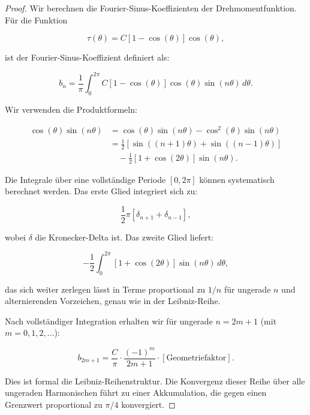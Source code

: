 \documentclass[a4paper,12pt]{article}
\theoremstyle{definition}
\begin{document}
\begin{proof}
  Wir berechnen die Fourier-Sinus-Koeffizienten der Drehmomentfunktion. Für die Funktion
  
  \begin{equation}
    \tau(\theta) = C[1 - \cos(\theta)]\cos(\theta),
  \end{equation}
  
  ist der Fourier-Sinus-Koeffizient definiert als:
  
  \begin{equation}
    b_n = \frac{1}{\pi} \int_0^{2\pi} C[1-\cos(\theta)]\cos(\theta) \sin(n\theta) \, d\theta.
  \end{equation}
  
  Wir verwenden die Produktformeln:
  
  \begin{align}
    [1-\cos(\theta)]\cos(\theta) \sin(n\theta) &= \cos(\theta)\sin(n\theta) - \cos^2(\theta)\sin(n\theta) \\
    &= \frac{1}{2}[\sin((n+1)\theta) + \sin((n-1)\theta)] \\
    &\quad - \frac{1}{2}[1 + \cos(2\theta)]\sin(n\theta).
  \end{align}
  
  Die Integrale über eine vollständige Periode $[0, 2\pi]$ können systematisch berechnet werden. Das erste Glied integriert sich zu:
  
  \begin{equation}
    \frac{1}{2}\pi[\delta_{n+1} + \delta_{n-1}],
  \end{equation}
  
  wobei $\delta$ die Kronecker-Delta ist. Das zweite Glied liefert:
  
  \begin{equation}
    -\frac{1}{2}\int_0^{2\pi} [1 + \cos(2\theta)]\sin(n\theta) \, d\theta,
  \end{equation}
  
  das sich weiter zerlegen lässt in Terme proportional zu $1/n$ für ungerade $n$ und alternierenden Vorzeichen, genau wie in der Leibniz-Reihe.
  
  Nach vollständiger Integration erhalten wir für ungerade $n = 2m+1$ (mit $m = 0, 1, 2, \ldots$):
  
  \begin{equation}
    b_{2m+1} = \frac{C}{\pi} \cdot \frac{(-1)^m}{2m+1} \cdot [\text{Geometriefaktor}].
  \end{equation}
  
  Dies ist formal die Leibniz-Reihenstruktur. Die Konvergenz dieser Reihe über alle ungeraden Harmonischen führt zu einer Akkumulation, die gegen einen Grenzwert proportional zu $\pi/4$ konvergiert.
\end{proof}
\end{document}
